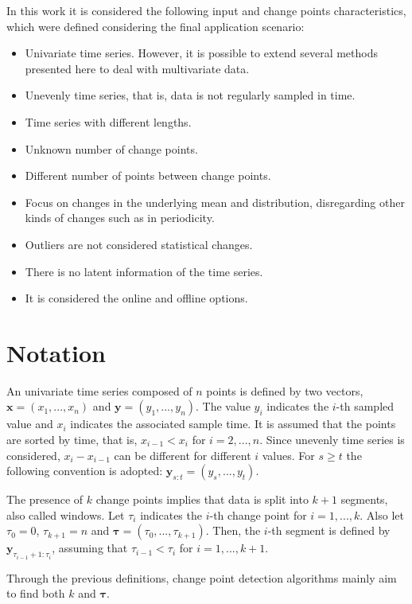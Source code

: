 In this work it is considered the following input and change points characteristics, which were defined considering the final application scenario:
\begin{itemize}
    \item Univariate time series. However, it is possible to extend several methods presented here to deal with multivariate data.
    \item Unevenly time series, that is, data is not regularly sampled in time.
    \item Time series with different lengths.
    \item Unknown number of change points.
    \item Different number of points between change points.
    \item Focus on changes in the underlying mean and distribution, disregarding other kinds of changes such as in periodicity.
    \item Outliers are not considered statistical changes.
    \item There is no latent information of the time series.
    \item It is considered the online and offline options.
\end{itemize}

\section{Notation}

An univariate time series composed of $n$ points is defined by two vectors, $\mathbf{x} = (x_{1}, ..., x_{n})$ and $\mathbf{y} = (y_{1}, ..., y_{n})$. The value $y_{i}$ indicates the $i$-th sampled value and $x_{i}$ indicates the associated sample time. It is assumed that the points are sorted by time, that is, $x_{i - 1} < x_{i}$ for $i = 2, ..., n$. Since unevenly time series is considered, $x_{i} - x_{i - 1}$ can be different for different $i$ values. For $s \ge t$ the following convention is adopted: $\mathbf{y}_{s:t} = (y_{s}, ..., y_{t})$.

The presence of $k$ change points implies that data is split into $k+1$ segments, also called windows. Let $\tau_{i}$ indicates the $i$-th change point for $i=1,...,k$. Also let $\tau_{0} = 0$, $\tau_{k + 1} = n$ and $\boldsymbol \tau = (\tau_{0}, ..., \tau_{k + 1})$. Then, the $i$-th segment is defined by $\mathbf{y}_{\tau_{i - 1} + 1 : \tau_{i}}$, assuming that $\tau_{i - 1} < \tau_{i}$ for $i = 1, ..., k + 1$.

Through the previous definitions, change point detection algorithms mainly aim to find both $k$ and $\boldsymbol \tau$.

